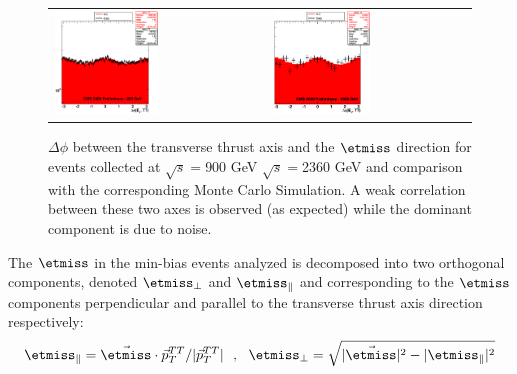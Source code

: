 \begin{figure}[h!]
 \centering
 \begin{tabular}{ll}
   \includegraphics[width=0.5\textwidth]{plots_DataVsMC_MB_900GeV/dphi_TT_900.eps}&
    \includegraphics[width=0.5\textwidth]{plots_DataVsMC_MB_2360GeV/dphi_TT_2360.eps}\\
 \end{tabular}
    \caption{$\Delta\phi$ between the transverse thrust axis and the
      $\etmiss$ direction for events collected at $\sqrt{s}=$900 GeV
      $\sqrt{s}=$2360 GeV and comparison with the corresponding Monte
      Carlo Simulation.  A weak correlation between these two axes is
      observed (as expected) while the dominant component is due to
      noise.
      \label{fig:MET-TT}}
\end{figure}

The $\etmiss$ in the min-bias events analyzed is
decomposed into two orthogonal components, denoted $\etmiss_\perp$ and
$\etmiss_\parallel$ and corresponding to the $\etmiss$ components
perpendicular and parallel to the transverse thrust axis direction
respectively:
\begin{equation}
{\rm \etmiss}_{\parallel} = \vec\etmiss\cdot
\vec{p}_{T}^{TT}/|\vec{p}_{T}^{TT}|~~,
    ~~ {\rm \etmiss}_{\perp} =
\sqrt{|\vec\etmiss|^{2} -
|\rm{\etmiss}_{\parallel}|^{2}}
\label{eq:U}
\end{equation}

